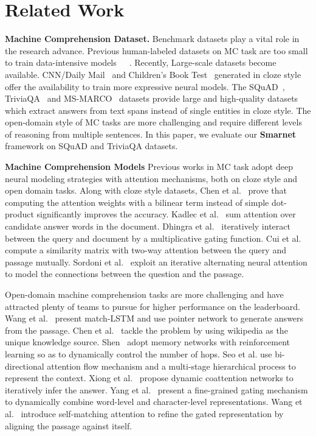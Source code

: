 \documentclass[letterpaper]{article} \usepackage{aaai18}  \usepackage{times}  \usepackage{helvet}  \usepackage{courier}  \usepackage{url}  \usepackage{graphicx}  \usepackage{booktabs}
\begin{document}
 \section{Related Work}
 \noindent\textbf{Machine Comprehension Dataset.} Benchmark datasets play a vital role in the research advance. Previous human-labeled datasets on MC task are too small to train data-intensive models~\cite{Richardson2013MCTestAC}~\cite{Berant2014ModelingBP}~\cite{Yu2016End}. Recently, Large-scale datasets become available. CNN/Daily Mail~\cite{Hermann2015TeachingMT} and Children's Book Test~\cite{Hill2015The} generated in cloze style offer the availability to train more expressive neural models. The SQuAD~\cite{rajpurkar2016squad}, TriviaQA~\cite{Joshi2017TriviaQAAL} and MS-MARCO~\cite{Nguyen2016MS} datasets provide large and high-quality datasets which extract answers from text spans instead of single entities in cloze style. The open-domain style of MC tasks are more challenging and require different levels of reasoning from multiple sentences. In this paper, we evaluate our \textbf{Smarnet} framework on SQuAD and TriviaQA datasets. 
 
 \noindent \textbf{Machine Comprehension Models} Previous works in MC task adopt deep neural modeling strategies with attention mechanisms, both on cloze style and open domain tasks. Along with cloze style datasets, Chen et al.~\cite{Chen2016A} prove that computing the attention weights with a bilinear term instead of simple dot-product significantly improves the accuracy. Kadlec et al.~\cite{Kadlec2016Text} sum attention over candidate answer words in the document. Dhingra et al.~\cite{Dhingra2017Gated} iteratively interact between the query and document by a multiplicative gating function. Cui et al.~\cite{Cui2016Attention} compute a similarity matrix with two-way attention between the query and passage mutually. Sordoni et al.~\cite{Sordoni2016Iterative} exploit an iterative alternating neural attention to model the connections between the question and the passage. 
 
 Open-domain machine comprehension tasks are more challenging and have attracted plenty of teams to pursue for higher performance on the leaderboard. Wang et al.~\cite{Wang2016Machine} present match-LSTM and use pointer network to generate answers from the passage. Chen et al.~\cite{chen2017reading} tackle the problem by using wikipedia as the unique knowledge source. Shen~\cite{shen2017reasonet} adopt memory networks with reinforcement learning so as to dynamically control the number of hops. Seo et al. \cite{seo2016bidirectional} use bi-directional attention flow mechanism and a multi-stage hierarchical process to represent the context. Xiong et al.~\cite{xiong2016dynamic} propose dynamic coattention networks to iteratively infer the answer. Yang et al.~\cite{Yang2016Words} present a fine-grained gating mechanism to dynamically combine word-level and character-level representations. Wang et al.~\cite{Wang2017GatedSN} introduce self-matching attention to refine the gated representation by aligning the passage against itself. 
 
\end{document}
